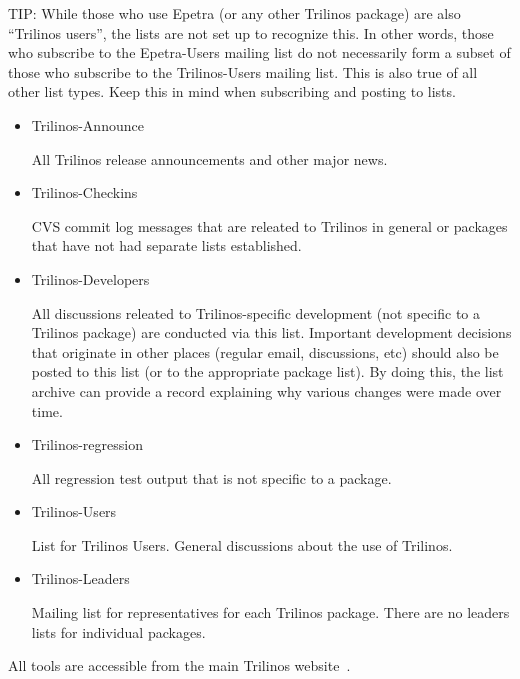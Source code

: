 \documentclass[12pt,relax]{TrilinosDevGuide}
\begin{document}
TIP: While those who use Epetra (or any other Trilinos package) are also
``Trilinos users'', the lists are not set up to recognize this.  In other 
words, those who subscribe to the Epetra-Users mailing list do not necessarily 
form a subset of those who subscribe to the Trilinos-Users mailing list.  This 
is also true of all other list types.  Keep this in mind when subscribing and 
posting to lists.
\begin{itemize}
\item Trilinos-Announce 

All Trilinos release announcements and other major news.

\item Trilinos-Checkins 

CVS commit log messages that are releated to Trilinos in general or packages 
that have not had separate lists established.

\item Trilinos-Developers 

All discussions releated to Trilinos-specific development (not specific to a 
Trilinos package) are conducted via this list.  Important development 
decisions that originate in other places (regular email, discussions, etc) 
should also be posted to this list (or to the appropriate package list).  
By doing this, the list archive can provide a record explaining why various 
changes were made over time.

\item Trilinos-regression 

All regression test output that is not specific to a package. 

\item Trilinos-Users 

List for Trilinos Users.  General discussions about the use of Trilinos.

\item Trilinos-Leaders

Mailing list for representatives for each Trilinos package.  There are no 
leaders lists for individual packages.
\end{itemize}

All tools are accessible from the main Trilinos 
website~\cite{Trilinos-home-page}.
\end{document}
